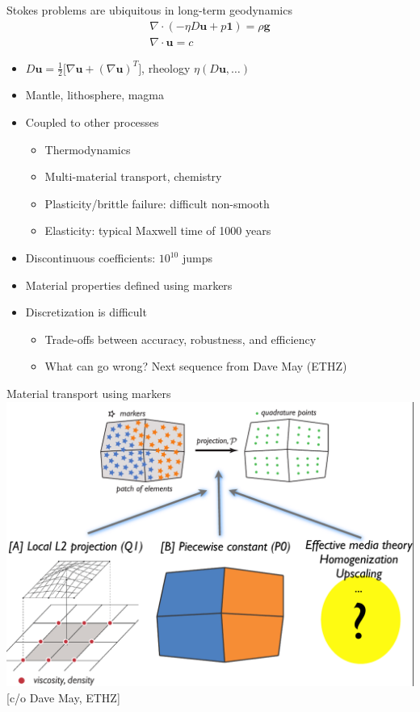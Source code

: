 \documentclass{beamer}
\begin{document}
\begin{frame}{Stokes problems are ubiquitous in long-term geodynamics}
  \begin{gather*}
    \nabla\cdot (-\eta D \bm u + p\bm 1) = \rho \bm g \\
    \nabla\cdot \bm u = c
  \end{gather*}
  \vspace{-2ex}
  \begin{itemize}
  \item $D\bm u = \frac 1 2 \big[ \nabla \bm u + (\nabla \bm u)^T \big]$, rheology $\eta(D\bm u,\dotsc)$
  \item Mantle, lithosphere, magma
  \item Coupled to other processes
    \begin{itemize}
    \item Thermodynamics
    \item Multi-material transport, chemistry
    \item Plasticity/brittle failure: difficult non-smooth
    \item Elasticity: typical Maxwell time of 1000 years
    \end{itemize}
  \item Discontinuous coefficients: $10^{10}$ jumps
  \item Material properties defined using markers
  \item Discretization is difficult
    \begin{itemize}
    \item Trade-offs between accuracy, robustness, and efficiency
    \item What can go wrong?  Next sequence from Dave May (ETHZ)
    \end{itemize}
  \end{itemize}
\end{frame}

{

}

\begin{frame}{Material transport using markers}
  \includegraphics[width=\textwidth]{figures/MayMarkersHomogenization.png} \\
  {\scriptsize [c/o Dave May, ETHZ]}
\end{frame}
\end{document}
